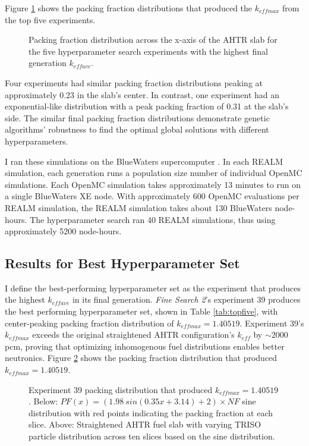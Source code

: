 Figure \ref{fig:topfiveplot} shows the packing fraction distributions that 
produced the $k_{eff max}$ from the top five experiments. 
\begin{figure}[]
    \centering
    \caption{Packing fraction distribution across the x-axis of the \acrfull{AHTR} 
    slab for the five hyperparameter search experiments with the highest final generation 
    $k_{eff ave}$.}
    \label{fig:topfiveplot}
\end{figure}
Four experiments had similar packing fraction distributions peaking at approximately 
0.23 in the slab's center. 
In contrast, one experiment had an exponential-like distribution with a peak 
packing fraction of 0.31 at the slab's side.
The similar final packing fraction distributions demonstrate genetic algorithms' 
robustness to find the optimal global solutions with different hyperparameters. 

I ran these simulations on the BlueWaters supercomputer \cite{ncsa_about_2017}. 
In each \gls{REALM} simulation, each generation runs a population size number 
of individual OpenMC simulations. 
Each OpenMC simulation takes approximately 13 minutes to run on a single BlueWaters 
XE node. 
With approximately 600 OpenMC evaluations per \gls{REALM} simulation, the
\gls{REALM} simulation takes about 130 BlueWaters node-hours. 
The hyperparameter search ran 40 \gls{REALM} simulations, thus using approximately
5200 node-hours.

\subsection{Results for Best Hyperparameter Set}
\label{sec:best}
I define the best-performing hyperparameter set as the experiment that produces 
the highest $k_{eff ave}$ in its final generation. 
\textit{Fine Search 2}'s experiment 39 produces the best performing 
hyperparameter set, shown in Table \ref{tab:topfive}, with 
center-peaking packing fraction distribution of $k_{eff max} = 1.40519$. 
Experiment 39's $k_{eff max}$ exceeds the original straightened \gls{AHTR} 
configuration's $k_{eff}$ by $\sim2000$pcm, proving that optimizing
inhomogenous fuel distributions enables better neutronics. 
Figure \ref{fig:triso_distribution_sine_39} shows the packing fraction distribution 
that produced $k_{eff max} = 1.40519$. 
\begin{figure}[]
    \centering
    \caption{Experiment 39 packing distribution that produced $k_{eff max} = 1.40519$. 
    Below: $PF(x) = (1.98\ sin(0.35x+3.14)+2)  \times NF$ sine distribution with 
    red points indicating the packing fraction at each slice. 
    Above: Straightened \acrfull{AHTR} fuel slab with varying \gls{TRISO} particle 
    distribution across ten slices based on the sine distribution. }
    \label{fig:triso_distribution_sine_39}
\end{figure}

